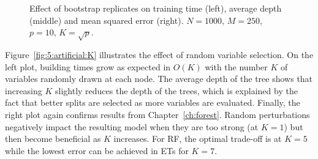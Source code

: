 \begin{figure}
\hspace{-1.75cm}
\caption{Effect of bootstrap replicates on training time (left), average depth (middle) and mean squared error (right). $N=1000$, $M=250$, $p=10$, $K=\sqrt{p}$.}
\label{fig:5:artificial:bootstrap}
\end{figure}

Figure~\ref{fig:5:artificial:K} illustrates the effect of random variable
selection. On the left plot, building times grow as expected in $O(K)$ with the
number $K$ of variables randomly drawn at each node. The average depth of the
tree shows that increasing $K$ slightly reduces the depth of the trees, which
is  explained by the fact that better splits are selected as more variables are
evaluated. Finally, the right plot again confirms results from
Chapter~\ref{ch:forest}. Random perturbations negatively impact the resulting
model when they are too strong (at $K=1$) but then become beneficial as $K$
increases. For RF, the optimal trade-off is at $K=5$ while the lowest error can
be achieved in ETs for $K=7$.

